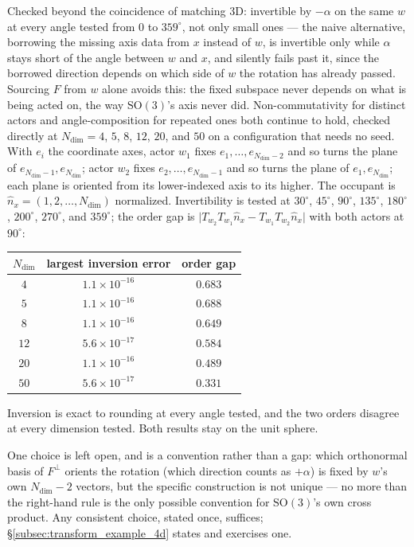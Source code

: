 \documentclass[12pt, a4paper]{article}
\begin{document}
Checked beyond the coincidence of matching 3D: invertible by
$-\alpha$ on the same $w$ at every angle tested from $0$ to
$359^\circ$, not only small ones --- the naive alternative, borrowing
the missing axis data from $x$ instead of $w$, is invertible only
while $\alpha$ stays short of the angle between $w$ and $x$, and
silently fails past it, since the borrowed direction depends on
which side of $w$ the rotation has already passed. Sourcing $F$ from
$w$ alone avoids this: the fixed subspace never depends on what is
being acted on, the way $\mathrm{SO}(3)$'s axis never did.
Non-commutativity for distinct actors and angle-composition for
repeated ones both continue to hold, checked directly at
$N_{\mathrm{dim}}=4$, $5$, $8$, $12$, $20$, and $50$ on a
configuration that needs no seed. With $e_i$ the coordinate axes, actor $w_1$ fixes
$e_1,\ldots,e_{N_{\mathrm{dim}}-2}$ and so turns the plane of
$e_{N_{\mathrm{dim}}-1},e_{N_{\mathrm{dim}}}$; actor $w_2$ fixes
$e_2,\ldots,e_{N_{\mathrm{dim}}-1}$ and so turns the plane of
$e_1,e_{N_{\mathrm{dim}}}$; each plane is oriented from its
lower-indexed axis to its higher. The occupant is
$\hat n_x=(1,2,\ldots,N_{\mathrm{dim}})$ normalized. Invertibility is
tested at $30^\circ$, $45^\circ$, $90^\circ$, $135^\circ$,
$180^\circ$, $200^\circ$, $270^\circ$, and $359^\circ$; the order
gap is $\lvert T_{w_2}T_{w_1}\hat n_x-T_{w_1}T_{w_2}\hat n_x\rvert$
with both actors at $90^\circ$:
\begin{center}
\begin{tabular}{ccc}
$N_{\mathrm{dim}}$ & largest inversion error & order gap \\
\hline
$4$ & $1.1\times10^{-16}$ & $0.683$ \\
$5$ & $1.1\times10^{-16}$ & $0.688$ \\
$8$ & $1.1\times10^{-16}$ & $0.649$ \\
$12$ & $5.6\times10^{-17}$ & $0.584$ \\
$20$ & $1.1\times10^{-16}$ & $0.489$ \\
$50$ & $5.6\times10^{-17}$ & $0.331$ \\
\end{tabular}
\end{center}
Inversion is exact to rounding at every angle tested, and the two
orders disagree at every dimension tested. Both results stay on the unit sphere.

One choice is left open, and is a convention rather than a gap:
which orthonormal basis of $F^\perp$ orients the rotation (which
direction counts as $+\alpha$) is fixed by $w$'s own
$N_{\mathrm{dim}}-2$ vectors, but the specific construction is not
unique --- no more than the right-hand rule is the only possible
convention for $\mathrm{SO}(3)$'s own cross product. Any consistent
choice, stated once, suffices; \S\ref{subsec:transform_example_4d}
states and exercises one.
\end{document}
